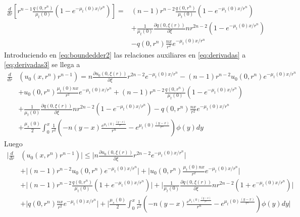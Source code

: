 \begin{equation}
\begin{split}
\frac{d }{dr} \left[ r^{n-1}\frac{q(0,r^n)}{\mu_t(0)}\left(1-e^{-\mu_t(0)x/r^n}\right)
\right]=&
 (n-1)r^{n-2}\frac{q(0,r^n)}{\mu_t(0)} \left( 1-e^{-\mu_t(0)x/r^n} \right)\\ 
 &+\frac{1}{\mu_t(0)}\frac{\partial q(0,\xi(r))}{\partial \xi} nr^{2n-2} (1-e^{-\mu_t(0)x/r^n})\\&-q(0,r^n)\frac{nx}{r^{2}}e^{-\mu_t(0)x/r^n}
\end{split}
\label{eq:derivadas3}
\end{equation}
Introduciendo en \eqref{eq:boundedder2} las relaciones auxiliares en \eqref{eq:derivadas} a \eqref{eq:derivadas3} se llega a
\begin{equation}
\begin{split}
\frac{d }{dr} & \left( u_0(x,r^n) r^{n-1} \right)=
n\frac{\partial u_0(0,\xi(r))}{\partial \xi}r^{2n-2}e^{-\mu_t(0)x/r^n} - (n-1) r^{n-2}u_0(0,r^n)e^{-\mu_t(0)x/r^n}\\
&+u_0(0,r^n)\frac{\mu_t(0)nx}{r^{2}}e^{-\mu_t(0)x/r^n}+ (n-1)r^{n-2}\frac{q(0,r^n)}{\mu_t(0)} \left( 1-e^{-\mu_t(0)x/r^n} \right)\\
&+\frac{1}{\mu_t(0)}\frac{\partial q(0,\xi(r))}{\partial \xi} nr^{2n-2} (1-e^{-\mu_t(0)x/r^n})-q(0,r^n)\frac{nx}{r^{2}}e^{-\mu_t(0)x/r^n}\\
&+\frac{\mu_s(0)}{2} \int_0^{x} \frac{1}{r^2} \left(-n(y-x) \frac{e^{\mu_t(0)\frac{(y-x)}{r^n}}}{r^n}
- e^{\mu_t(0)\frac{(y-x)}{r^n}}\right)  \phi(y) dy
\end{split}
\label{eq:boundedder3}
\end{equation}
Luego
\begin{equation}
\begin{split}
 \Bigg| \frac{d }{dr}& \left( u_0(x,r^n) r^{n-1} \right) \Bigg| \leq 
 \Bigg| n\frac{\partial u_0(0,\xi(r))}{\partial \xi}r^{2n-2}e^{-\mu_t(0)x/r^n}\Bigg|\\
&+\Bigg| (n-1) r^{n-2}u_0(0,r^n)e^{-\mu_t(0)x/r^n}\Bigg| +\Bigg|u_0(0,r^n)\frac{\mu_t(0)nx}{r^{2}}e^{-\mu_t(0)x/r^n}\Bigg|\\
& + \Bigg|(n-1)r^{n-2}\frac{q(0,r^n)}{\mu_t(0)} \left( 1+e^{-\mu_t(0)x/r^n} \right)\Bigg|+
\Bigg|\frac{1}{\mu_t(0)}\frac{\partial q(0,\xi(r))}{\partial \xi} nr^{2n-2} (1+e^{-\mu_t(0)x/r^n})\Bigg|\\&+\Bigg|q(0,r^n)\frac{nx}{r^{2}}e^{-\mu_t(0)x/r^n}\Bigg|+\Bigg| \frac{\mu_s(0)}{2} \int_0^{x} \frac{1}{r^2} \left(-n(y-x) \frac{e^{\mu_t(0)\frac{(y-x)}{r^n}}}{r^n}
- e^{\mu_t(0)\frac{(y-x)}{r^n}}\right)  \phi(y) dy \Bigg|
\end{split}
\label{eq:bounding}
\end{equation}

